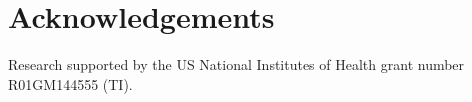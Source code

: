 \documentclass[iucr]{iucrjournals}
\begin{document}
\section*{Acknowledgements}
Research supported by the US National Institutes of Health grant number R01GM144555 (TI).


% 
% 




% 
% 
\end{document}
